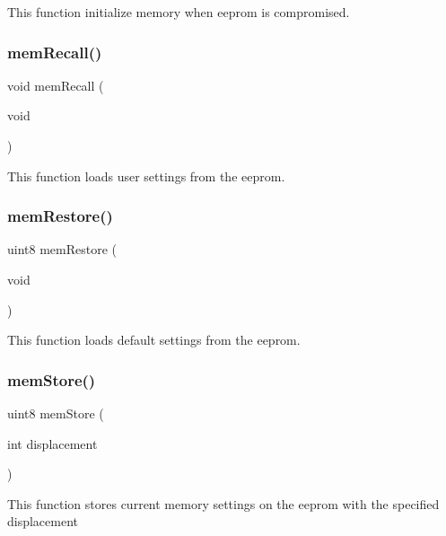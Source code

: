 This function initialize memory when eeprom is compromised. \mbox{\label{command__processing_8c_a494f1f72ae370f0057e5aa3db73ef6fb}} 
\subsubsection{mem\+Recall()}
{\footnotesize\ttfamily void mem\+Recall (\begin{DoxyParamCaption}\item[{void}]{ }\end{DoxyParamCaption})}

This function loads user settings from the eeprom. \mbox{\label{command__processing_8c_af67845c368ea7fefb79a1f0baa12134c}} 
\subsubsection{mem\+Restore()}
{\footnotesize\ttfamily uint8 mem\+Restore (\begin{DoxyParamCaption}\item[{void}]{ }\end{DoxyParamCaption})}

This function loads default settings from the eeprom. \mbox{\label{command__processing_8c_a81e6b73c0ee52661736a97c08bdb262b}} 
\subsubsection{mem\+Store()}
{\footnotesize\ttfamily uint8 mem\+Store (\begin{DoxyParamCaption}\item[{int}]{displacement }\end{DoxyParamCaption})}

This function stores current memory settings on the eeprom with the specified displacement 